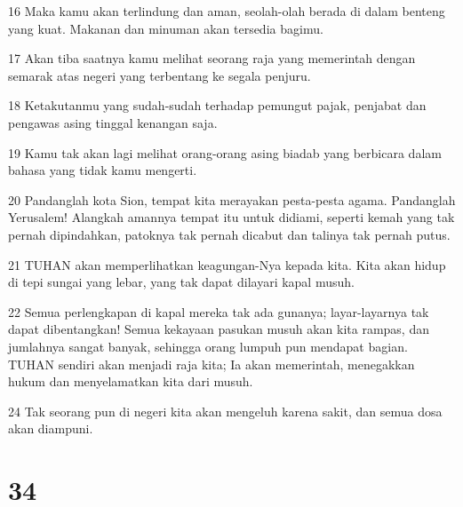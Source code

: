 \par 16 Maka kamu akan terlindung dan aman, seolah-olah berada di dalam benteng yang kuat. Makanan dan minuman akan tersedia bagimu.
\par 17 Akan tiba saatnya kamu melihat seorang raja yang memerintah dengan semarak atas negeri yang terbentang ke segala penjuru.
\par 18 Ketakutanmu yang sudah-sudah terhadap pemungut pajak, penjabat dan pengawas asing tinggal kenangan saja.
\par 19 Kamu tak akan lagi melihat orang-orang asing biadab yang berbicara dalam bahasa yang tidak kamu mengerti.
\par 20 Pandanglah kota Sion, tempat kita merayakan pesta-pesta agama. Pandanglah Yerusalem! Alangkah amannya tempat itu untuk didiami, seperti kemah yang tak pernah dipindahkan, patoknya tak pernah dicabut dan talinya tak pernah putus.
\par 21 TUHAN akan memperlihatkan keagungan-Nya kepada kita. Kita akan hidup di tepi sungai yang lebar, yang tak dapat dilayari kapal musuh.
\par 22 Semua perlengkapan di kapal mereka tak ada gunanya; layar-layarnya tak dapat dibentangkan! Semua kekayaan pasukan musuh akan kita rampas, dan jumlahnya sangat banyak, sehingga orang lumpuh pun mendapat bagian. TUHAN sendiri akan menjadi raja kita; Ia akan memerintah, menegakkan hukum dan menyelamatkan kita dari musuh.
\par 24 Tak seorang pun di negeri kita akan mengeluh karena sakit, dan semua dosa akan diampuni.

\chapter{34}

